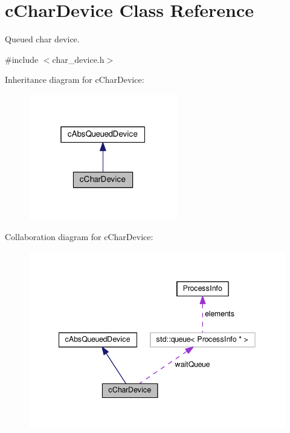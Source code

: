 \hypertarget{classcCharDevice}{\section{c\-Char\-Device \-Class \-Reference}
\label{d9/de9/classcCharDevice}
}


\-Queued char device.  




{\ttfamily \#include $<$char\-\_\-device.\-h$>$}



\-Inheritance diagram for c\-Char\-Device\-:\nopagebreak
\begin{figure}[H]
\begin{center}
\leavevmode
\includegraphics[width=184pt]{d9/dc1/classcCharDevice__inherit__graph}
\end{center}
\end{figure}


\-Collaboration diagram for c\-Char\-Device\-:\nopagebreak
\begin{figure}[H]
\begin{center}
\leavevmode
\includegraphics[width=342pt]{de/d1a/classcCharDevice__coll__graph}
\end{center}
\end{figure}
